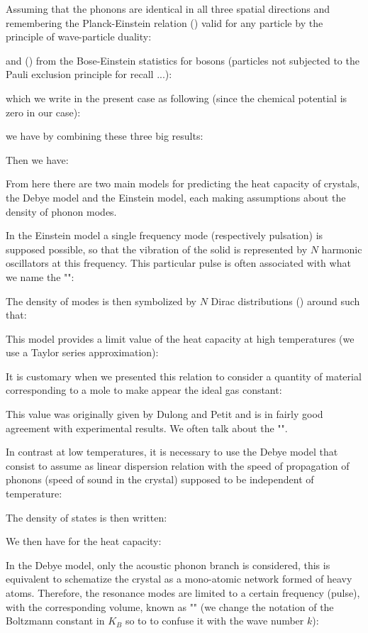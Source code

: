 	Assuming that the phonons are identical in all three spatial directions and remembering the Planck-Einstein relation () valid for any particle by the principle of wave-particle duality:
	
	and () from the Bose-Einstein statistics for bosons (particles not subjected to the Pauli exclusion principle for recall ...):
	
	which we write in the present case as following (since the chemical potential is zero in our case):
	
	we have by combining these three big results:
	
	Then we have:
	
	From here there are two main models for predicting the heat capacity of crystals, the Debye model and the Einstein model, each making assumptions about the density of phonon modes.

	In the Einstein model a single frequency mode (respectively pulsation) is supposed possible, so that the vibration of the solid is represented by $N$ harmonic oscillators at this frequency. This particular pulse is often associated with what we name the "":
	
	The density of modes is then symbolized by $N$ Dirac distributions () around such that:
	
	This model provides a limit value of the heat capacity at high temperatures (we use a Taylor series approximation):
	
	It is customary when we presented this relation to consider a quantity of material corresponding to a mole to make appear the ideal gas constant:
	
	This value was originally given by Dulong and Petit and is in fairly good agreement with experimental results. We often talk about the "".

	In contrast at low temperatures, it is necessary to use the Debye model that consist to assume as linear dispersion relation with the speed of propagation of phonons (speed of sound in the crystal) supposed to be independent of temperature:
	
	The density of states is then written:
	
	We then have for the heat capacity:
	
	In the Debye model, only the acoustic phonon branch is considered, this is equivalent to schematize the crystal as a mono-atomic network formed of heavy atoms. Therefore, the resonance modes are limited to a certain frequency (pulse), with the corresponding volume, known as "" (we change the notation of the Boltzmann constant in $K_B$ so to to confuse it with the wave number $k$):
	
